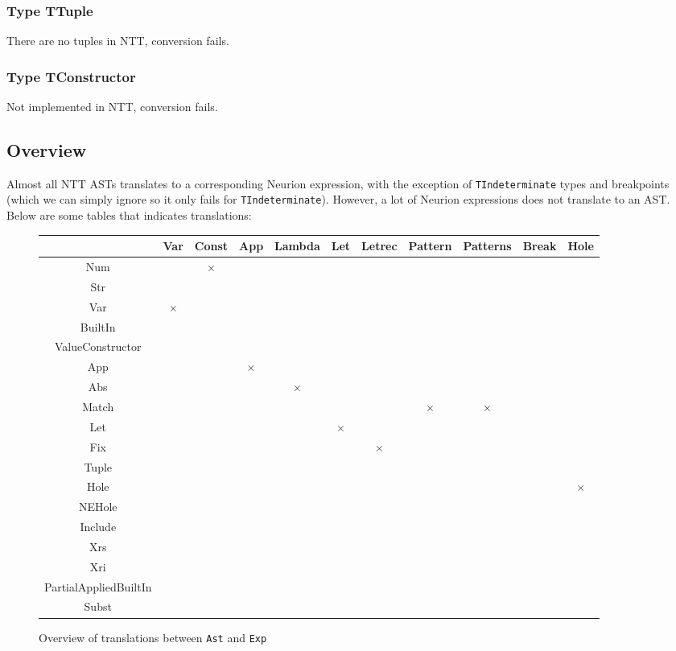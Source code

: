 \documentclass[10pt,a4paper,english]{article}
\begin{document}
\subsubsection*{Type TTuple}
There are no tuples in NTT, conversion fails.

\subsubsection*{Type TConstructor}
Not implemented in NTT, conversion fails.

\subsection{Overview}
Almost all NTT ASTs translates to a corresponding Neurion expression, with the exception of \texttt{TIndeterminate} types and breakpoints (which we can simply ignore so it only fails for \texttt{TIndeterminate}). However, a lot of Neurion expressions does not translate to an AST. Below are some tables that indicates translations:
\begin{figure}[H]
\begin{center}
\begin{tabular}{|c||c|c|c|c|c|c|c|c|c|c|}
  \hline
       & Var & Const & App & Lambda & Let & Letrec & Pattern & Patterns & Break & Hole\\ \hline\hline
  Num & & $\times$ & & & & & & & & \\ \hline
  Str & & & & & & & & & & \\ \hline
  Var & $\times$ & & & & & & & & & \\ \hline
  BuiltIn & & & & & & & & & & \\ \hline
  ValueConstructor & & & & & & & & & & \\ \hline
  App & & & $\times$ & & & & & & & \\ \hline
  Abs & & & & $\times$ & & & & & & \\ \hline
  Match & & & & & & & $\times$ & $\times$& & \\ \hline
  Let & & & & & $\times$& & & & & \\ \hline
  Fix & & & & & & $\times$ & & & & \\ \hline
  Tuple & & & & & & & & & & \\ \hline
  Hole & & & & & & & & & & $\times$\\ \hline
  NEHole & & & & & & & & & & \\ \hline
  Include & & & & & & & & & & \\ \hline
  Xrs & & & & & & & & & & \\ \hline
  Xri & & & & & & & & & & \\ \hline
  PartialAppliedBuiltIn & & & & & & & & & & \\ \hline
  Subst & & & & & & & & & & \\ \hline
\end{tabular}
\end{center}
\label{fig:ASTtoEXP}
\caption{Overview of translations between \texttt{Ast} and \texttt{Exp}}
\end{figure}
\end{document}
